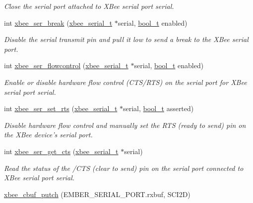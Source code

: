 \begin{DoxyCompactItemize}
\begin{DoxyCompactList}\small\item\em Close the serial port attached to X\-Bee serial port {\itshape serial}. \end{DoxyCompactList}\item 
int \hyperlink{group__hal__hcs08_gae19aa61eec588d1b935d267b0a982319}{xbee\-\_\-ser\-\_\-break} (\hyperlink{structxbee__serial__t}{xbee\-\_\-serial\-\_\-t} $\ast$serial, \hyperlink{group__hal_ga04dd5074964518403bf944f2b240a5f8}{bool\-\_\-t} enabled)
\begin{DoxyCompactList}\small\item\em Disable the serial transmit pin and pull it low to send a break to the X\-Bee serial port. \end{DoxyCompactList}\item 
int \hyperlink{group__hal__hcs08_ga33229d0d63ff1442f23b0739794d3afb}{xbee\-\_\-ser\-\_\-flowcontrol} (\hyperlink{structxbee__serial__t}{xbee\-\_\-serial\-\_\-t} $\ast$serial, \hyperlink{group__hal_ga04dd5074964518403bf944f2b240a5f8}{bool\-\_\-t} enabled)
\begin{DoxyCompactList}\small\item\em Enable or disable hardware flow control (C\-T\-S/\-R\-T\-S) on the serial port for X\-Bee serial port {\itshape serial}. \end{DoxyCompactList}\item 
int \hyperlink{group__hal__hcs08_gad1b1f9f42e58d8299ddcca1c9cb3c5e8}{xbee\-\_\-ser\-\_\-set\-\_\-rts} (\hyperlink{structxbee__serial__t}{xbee\-\_\-serial\-\_\-t} $\ast$serial, \hyperlink{group__hal_ga04dd5074964518403bf944f2b240a5f8}{bool\-\_\-t} asserted)
\begin{DoxyCompactList}\small\item\em Disable hardware flow control and manually set the R\-T\-S (ready to send) pin on the X\-Bee device's serial port. \end{DoxyCompactList}\item 
int \hyperlink{group__hal__hcs08_ga894f6fadc890b5ba5ce32338f0acd217}{xbee\-\_\-ser\-\_\-get\-\_\-cts} (\hyperlink{structxbee__serial__t}{xbee\-\_\-serial\-\_\-t} $\ast$serial)
\begin{DoxyCompactList}\small\item\em Read the status of the /\-C\-T\-S (clear to send) pin on the serial port connected to X\-Bee serial port {\itshape serial}. \end{DoxyCompactList}\item 
\hyperlink{group__hal__hcs08_gac4c834cc0ad3ee43af562f658833a6d5}{xbee\-\_\-cbuf\-\_\-putch} (E\-M\-B\-E\-R\-\_\-\-S\-E\-R\-I\-A\-L\-\_\-\-P\-O\-R\-T.\-rxbuf, S\-C\-I2\-D)

\end{DoxyCompactItemize}
